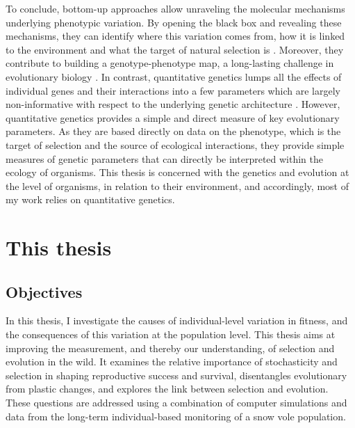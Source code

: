 To conclude, bottom-up approaches allow unraveling the molecular mechanisms underlying phenotypic variation. By opening the black box and revealing these mechanisms, they can identify where this variation comes from, how it is linked to the environment and what the target of natural selection is \parencite{DeJong2014}. Moreover, they contribute to building a genotype-phenotype map, a long-lasting challenge in evolutionary biology \parencite{Kirschner2010}.
In contrast, quantitative genetics lumps all the effects of individual genes and their interactions into a few parameters which are largely non-informative with respect to the underlying genetic architecture \parencite{Mackay2001,Nietlisbach2015,Huang041434}. However, quantitative genetics provides a simple and direct measure of key evolutionary parameters. As they are based directly on data on the phenotype, which is the target of selection and the source of ecological interactions, they provide simple measures of genetic parameters that can directly be interpreted within the ecology of organisms.
This thesis is concerned with the genetics and evolution at the level of organisms, in relation to their environment, and accordingly, most of my work relies on quantitative genetics.

\section{This thesis}
\subsection{Objectives}
In this thesis, I investigate the causes of individual-level variation in fitness, and the consequences of this variation at the population level. This thesis aims at improving the measurement, and thereby our understanding, of selection and evolution in the wild. It examines the relative importance of stochasticity and selection in shaping reproductive success and survival, disentangles evolutionary from plastic changes, and explores the link between selection and evolution. These questions are addressed using a combination of computer simulations and data from the long-term individual-based monitoring of a snow vole population.

